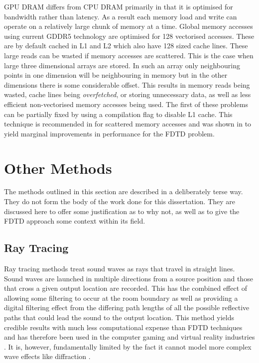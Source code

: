 \documentclass[12pt,a4paper]{report}
\begin{document}
GPU DRAM differs from CPU DRAM primarily in that it is optimised for bandwidth rather than latency. As a result each memory load and write can operate on a relatively large chunk of memory at a time. Global memory accesses using current GDDR5 technology are optimised for \SI{128}{\byte} vectorised accesses. These are by default cached in L1 and L2 which also have \SI{128}{\byte} sized cache lines. These large reads can be wasted if memory accesses are scattered. This is the case when large three dimensional arrays are stored. In such an array only neighbouring points in one dimension will be neighbouring in memory but in the other dimensions there is some considerable offset. This results in memory reads being wasted, cache lines being \emph{overfetched}, or storing unnecessary data, as well as less efficient non-vectorised memory accesses being used. The first of these problems can be partially fixed by using a compilation flag to disable L1 cache. This technique is recommended in \cite{ref:nvidia-gpu-programming-guide} for scattered memory accesses and was shown in \cite{craig} to yield marginal improvements in performance for the FDTD problem.

\section{Other Methods}

The methods outlined in this section are described in a deliberately terse way. They do not form the body of the work done for this dissertation. They are discussed here to offer some justification as to why not, as well as to give the FDTD approach some context within its field.

\subsection{Ray Tracing}

Ray tracing methods treat sound waves as rays that travel in straight lines. Sound waves are launched in multiple directions from a source position and those that cross a given output location are recorded. This has the combined effect of allowing some filtering to occur at the room boundary as well as providing a digital filtering effect from the differing path lengths of all the possible reflective paths that could lead the sound to the output location. This method yields credible results with much less computational expense than FDTD techniques and has therefore been used in the computer gaming and virtual reality industries \cite{ref:ray-trace}. It is, however, fundamentally limited by the fact it cannot model more complex wave effects like diffraction \cite{brian}. 
\end{document}
